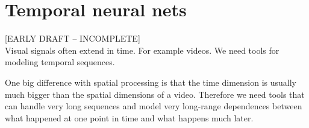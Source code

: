\newcommand{\xin}{\mathbf{x}_{\texttt{in}}}
\newcommand{\xout}{\mathbf{x}_{\texttt{out}}}
\newcommand{\xini}{x_{\texttt{in}_i}}
\newcommand{\xouti}{x_{\texttt{out}_i}}
\newcommand{\xink}{x_{\texttt{in}_k}}


\setcounter{chapter}{22}
\chapter{Temporal neural nets} 
[EARLY DRAFT -- INCOMPLETE]
\\

Visual signals often extend in time. For example videos. We need tools for modeling temporal sequences.

One big difference with spatial processing is that the time dimension is usually much bigger than the spatial dimensions of a video. Therefore we need tools that can handle very long sequences and model very long-range dependences between what happened at one point in time and what happens much later.








